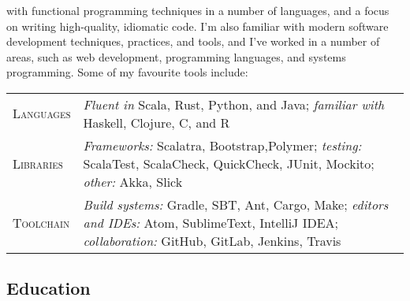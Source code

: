 \documentclass[a4paper]{tufte-handout}
\begin{document}
\begin{fullwidth}

\noindent
{} with functional programming techniques in a number of languages, and a focus on writing high-quality, idiomatic code. I'm also familiar with modern software development techniques, practices, and tools, and I've worked in a number of areas, such as web development, programming languages, and systems programming. Some of my favourite tools include: \\
    \footnotesize
\begin{tabular}{ l p{12.5cm} }

\textsc{Languages} & \emph{Fluent in} Scala, Rust, Python, and Java; \emph{familiar with} Haskell, Clojure, C, and R \\
\textsc{Libraries} & \emph{Frameworks:} Scalatra, Bootstrap,Polymer; \emph{testing:} ScalaTest, ScalaCheck, QuickCheck, JUnit, Mockito; \emph{other:} Akka, Slick \\
\textsc{Toolchain} & \emph{Build systems:} Gradle, SBT, Ant, Cargo, Make; \emph{editors and IDEs:} Atom, SublimeText, IntelliJ IDEA; \emph{collaboration:} GitHub, GitLab, Jenkins, Travis
\end{tabular}
\end{fullwidth}

\subsection{Education}
\end{document}
